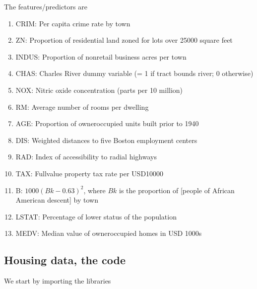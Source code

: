 \documentclass[letterpaper,10pt,english]{sphinxmanual}
\begin{document}
The features/predictors are
\begin{enumerate}
%
\item {} 
CRIM: Per capita crime rate by town

\item {} 
ZN: Proportion of residential land zoned for lots over 25000 square feet

\item {} 
INDUS: Proportion of non\sphinxhyphen{}retail business acres per town

\item {} 
CHAS: Charles River dummy variable (= 1 if tract bounds river; 0 otherwise)

\item {} 
NOX: Nitric oxide concentration (parts per 10 million)

\item {} 
RM: Average number of rooms per dwelling

\item {} 
AGE: Proportion of owner\sphinxhyphen{}occupied units built prior to 1940

\item {} 
DIS: Weighted distances to five Boston employment centers

\item {} 
RAD: Index of accessibility to radial highways

\item {} 
TAX: Full\sphinxhyphen{}value property tax rate per USD10000

\item {} 
B: \(1000(Bk - 0.63)^2\), where \(Bk\) is the proportion of {[}people of African American descent{]} by town

\item {} 
LSTAT: Percentage of lower status of the population

\item {} 
MEDV: Median value of owner\sphinxhyphen{}occupied homes in USD 1000s

\end{enumerate}


\subsection{Housing data, the code}
\label{\detokenize{chapter4:housing-data-the-code}}
We start by importing the libraries

\begin{sphinxVerbatim}[commandchars=\\\{\}]
   
    

     
   
\end{sphinxVerbatim}
\end{document}
